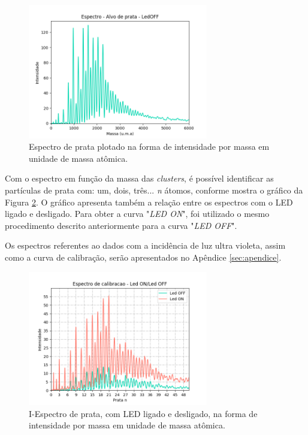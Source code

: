 \begin{figure}
  \centering  
  \includegraphics[width=0.7\textwidth]{graficos_resultados/0105_LEDOFF_espec_calib_ag_massa}
  \caption{Espectro de prata plotado na forma de intensidade por massa em unidade de massa atômica.}
  \label{fig:0105_LEDOFF_espec_calib_ag_massa} 
\end{figure}

Com o espectro em função da massa das \textit{clusters}, é possível identificar as partículas de prata com: um, dois, três... \textit{n} átomos, conforme mostra o gráfico da Figura \ref{fig:exp_01_LEDONOFF_N}. O gráfico apresenta também a relação entre os espectros com o LED ligado e desligado. Para obter a curva "\textit{LED ON}", foi utilizado o mesmo procedimento descrito anteriormente para a curva "\textit{LED OFF}".

Os espectros referentes ao dados com a incidência de luz ultra violeta, assim como a curva de calibração, serão apresentados no Apêndice \ref{sec:apendice}.

\begin{figure}
  \centering  
  \includegraphics[width=0.7\textwidth]{exp_01/Led_ON_Led_OFF_espectro_calib_prata_N_}
  \caption{I-Espectro de prata, com LED ligado e desligado, na forma de intensidade por massa em unidade de massa atômica.}
  \label{fig:exp_01_LEDONOFF_N}
\end{figure}

